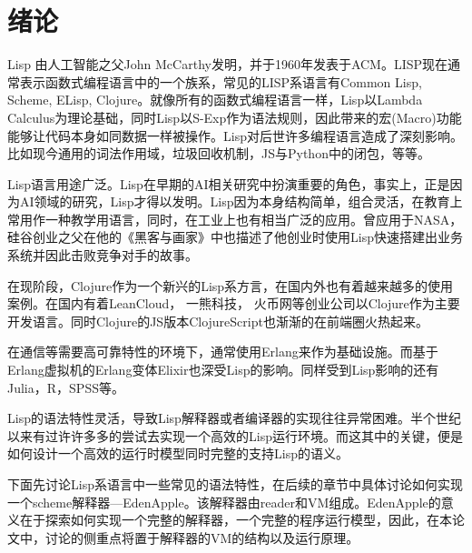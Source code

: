 %
%

\chapter{绪论}
\label{ch:intro}

Lisp 由人工智能之父John McCarthy发明，并于1960年发表于ACM\cite{mccarthy60}。LISP现在通常表示函数式编程语言中的一个族系，常见的LISP系语言有Common Lisp, Scheme, ELisp, Clojure。就像所有的函数式编程语言一样，Lisp以Lambda Calculus为理论基础，同时Lisp以S-Exp作为语法规则，因此带来的宏(Macro)功能能够让代码本身如同数据一样被操作。Lisp对后世许多编程语言造成了深刻影响。比如现今通用的词法作用域，垃圾回收机制，JS与Python中的闭包，等等。

Lisp语言用途广泛。Lisp在早期的AI相关研究中扮演重要的角色，事实上，正是因为AI领域的研究，Lisp才得以发明。Lisp因为本身结构简单，组合灵活，在教育上常用作一种教学用语言，同时，在工业上也有相当广泛的应用。曾应用于NASA，硅谷创业之父在他的《黑客与画家》中也描述了他创业时使用Lisp快速搭建出业务系统并因此击败竞争对手的故事。

在现阶段，Clojure作为一个新兴的Lisp系方言，在国内外也有着越来越多的使用案例。在国内有着LeanCloud， 一熊科技， 火币网等创业公司以Clojure作为主要开发语言。同时Clojure的JS版本ClojureScript也渐渐的在前端圈火热起来。

在通信等需要高可靠特性的环境下，通常使用Erlang\cite{armstrong07}来作为基础设施。而基于Erlang虚拟机的Erlang变体Elixir也深受Lisp的影响。同样受到Lisp影响的还有Julia，R，SPSS等。

Lisp的语法特性灵活，导致Lisp解释器或者编译器的实现往往异常困难。半个世纪以来有过许许多多的尝试去实现一个高效的Lisp运行环境。而这其中的关键，便是如何设计一个高效的运行时模型同时完整的支持Lisp的语义。

下面先讨论Lisp系语言中一些常见的语法特性，在后续的章节中具体讨论如何实现一个scheme解释器---EdenApple。该解释器由reader和VM组成。EdenApple的意义在于探索如何实现一个完整的解释器，一个完整的程序运行模型，因此，在本论文中，讨论的侧重点将置于解释器的VM的结构以及运行原理。
